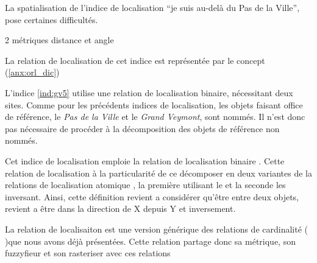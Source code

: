 La spatialisation de l'indice de localisation \enquote{je suis au-delà
  du Pas de la Ville}, pose certaines difficultés.


2 métriques distance et angle



La relation de localisation de cet indice est représentée par le
concept 
(\autoref{anx:orl_dic})


L'indice \ref{ind:gv5} utilise une relation de localisation binaire,
nécessitant deux sites. Comme pour les précédents indices de
localisation, les objets faisant office de référence, le \emph{Pas de
  la Ville} et le \emph{Grand Veymont}, sont nommés. Il n'est donc pas
nécessaire de procéder à la décomposition des objets de référence non
nommés.

Cet indice de localisation emploie la relation de localisation binaire
.
%
Cette relation de localisation à la particularité de ce décomposer
en deux variantes de la relations de localisation atomique
, la première utilisant le
%
et la seconde les inversant.
%
Ainsi, cette définition revient a considérer qu'être entre deux
objets, revient a être dans la direction de X depuis Y et inversement.

La relation de localisaiton  est
une version générique des relations de cardinalité (\eg
{})que nous avons déjà présentées.
%
Cette relation partage donc sa métrique, son fuzzyfieur et son
rasteriser avec ces relations




